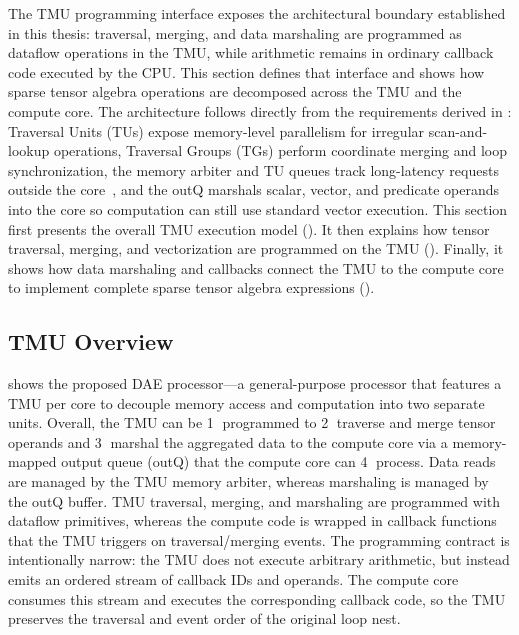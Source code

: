 The TMU programming interface exposes the architectural boundary established in this thesis: traversal, merging, and data marshaling are programmed as dataflow operations in the TMU, while arithmetic remains in ordinary callback code executed by the CPU. This section defines that interface and shows how sparse tensor algebra operations are decomposed across the TMU and the compute core. The architecture follows directly from the requirements derived in : Traversal Units (TUs) expose memory-level parallelism for irregular scan-and-lookup operations, Traversal Groups (TGs) perform coordinate merging and loop synchronization, the memory arbiter and TU queues track long-latency requests outside the core~\cite{esmailidokht2024micro}, and the outQ marshals scalar, vector, and predicate operands into the core so computation can still use standard vector execution.
This section first presents the overall TMU execution model (). It then explains how tensor traversal, merging, and vectorization are programmed on the TMU (). Finally, it shows how data marshaling and callbacks connect the TMU to the compute core to implement complete sparse tensor algebra expressions ().

\subsection{TMU Overview} \label{sec:tmu-overview} %

 shows the proposed DAE processor---a general-purpose processor that features a TMU per core to decouple memory access and computation into two separate units. Overall, the TMU can be \textcircled{1} programmed to \textcircled{2} traverse and merge tensor operands and \textcircled{3} marshal the aggregated data to the compute core via a memory-mapped output queue (outQ) that the compute core can \textcircled{4} process. Data reads are managed by the TMU memory arbiter, whereas marshaling is managed by the outQ buffer. TMU traversal, merging, and marshaling are programmed with dataflow primitives, whereas the compute code is wrapped in callback functions that the TMU triggers on traversal/merging events. The programming contract is intentionally narrow: the TMU does not execute arbitrary arithmetic, but instead emits an ordered stream of callback IDs and operands. The compute core consumes this stream and executes the corresponding callback code, so the TMU preserves the traversal and event order of the original loop nest.

